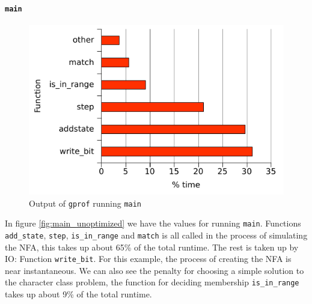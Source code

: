 \paragraph{\texttt{main}}
\begin{figure}
  \centering
  \includegraphics[]{optimizations/main_unoptimized.pdf}
  \caption{Output of \texttt{gprof} running \texttt{main}}
  \label{fig:main_unoptimized}
\end{figure}
In figure \vref{fig:main_unoptimized} we have the values for running
\texttt{main}. Functions \lstinline{add_state}, \lstinline{step},
\lstinline{is_in_range} and \lstinline{match} is all called in the
process of simulating the NFA, this takes up about 65\% of the total
runtime. The rest is taken up by IO: Function
\lstinline{write_bit}. For this example, the process of creating the
NFA is near instantaneous. We can also see the penalty for choosing a
simple solution to the character class problem, the function for
deciding membership \lstinline{is_in_range} takes up about 9\% of the
total runtime.

